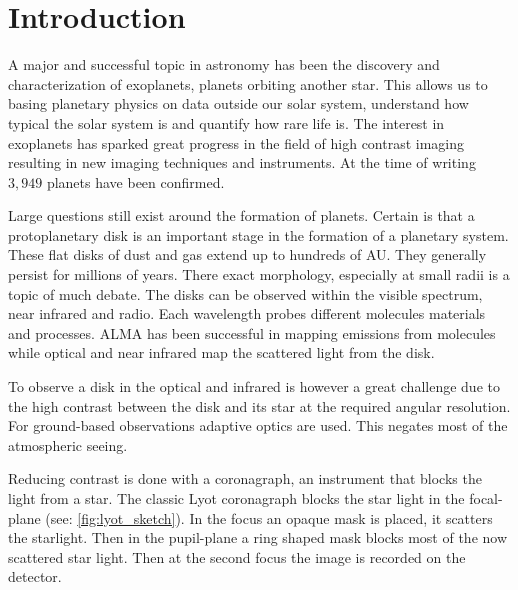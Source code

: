 
\chapter{Introduction} %

\label{ch:intro} %


A major and successful topic in astronomy has been the discovery and characterization of exoplanets, planets orbiting another star. This allows us to basing planetary physics on data outside our solar system, understand how typical the solar system is and quantify how rare life is. The interest in exoplanets has sparked great progress in the field of high contrast imaging resulting in new imaging techniques and instruments. At the time of writing $3,949$ planets have been confirmed. 

Large questions still exist around the formation of planets. Certain is that a protoplanetary disk is an important stage in the formation of a planetary system. These flat disks of dust and gas extend up to hundreds of AU. They generally persist for millions of years. There exact morphology, especially at small radii is a topic of much debate. The disks can be observed within the visible spectrum, near infrared and radio. Each wavelength probes different molecules materials and processes. ALMA has been successful in mapping emissions from molecules while optical and near infrared map the scattered light from the disk.

To observe a disk in the optical and infrared is however a great challenge due to the high contrast between the disk and its star at the required angular resolution. For ground-based observations adaptive optics are used. This negates most of the atmospheric seeing.

Reducing contrast is done with a coronagraph, an instrument that blocks the light from a star. The classic Lyot coronagraph blocks the star light in the focal-plane (see: \autoref{fig:lyot_sketch}). In the focus an opaque mask is placed, it scatters the starlight. Then in the pupil-plane a ring shaped mask blocks most of the now scattered star light. Then at the second focus the image is recorded on the detector.

